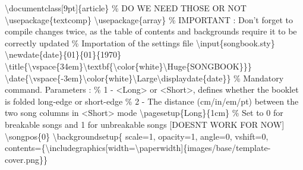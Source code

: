 \documentclass{article}%
\begin{document}
%
\normalsize%
\textbackslash{}documentclass{[}9pt{]}\{article\}\newline%
\newline%
\% DO WE NEED THOSE OR NOT\newline%
\textbackslash{}usepackage\{textcomp\}\newline%
\textbackslash{}usepackage\{array\}\newline%
\newline%
\% IMPORTANT : Don't forget to compile changes twice, as the table of contents and backgrounds require it to be correctly updated\newline%
\newline%
\% Importation of the settings file\newline%
\textbackslash{}input\{songbook.sty\}\newline%
 \newline%
\textbackslash{}newdate\{date\}\{01\}\{01\}\{1970\}\newline%
\textbackslash{}title\{\textbackslash{}vspace\{34em\}\textbackslash{}textbf\{\textbackslash{}color\{white\}\textbackslash{}Huge\{SONGBOOK\}\}\}\newline%
\textbackslash{}date\{\textbackslash{}vspace\{{-}3em\}\textbackslash{}color\{white\}\textbackslash{}Large\textbackslash{}displaydate\{date\}\}\newline%
\newline%
\% Mandatory command. Parameters :\newline%
\% 1 {-} <Long> or <Short>, defines whether the booklet is folded long{-}edge or short{-}edge\newline%
\% 2 {-} The distance (cm/in/em/pt) between the two song columns in <Short> mode\newline%
\textbackslash{}pagesetup\{Long\}\{1cm\}\newline%
\newline%
\% Set to 0 for breakable songs and 1 for unbreakable songs {[}DOESNT WORK FOR NOW{]}\newline%
\textbackslash{}songpos\{0\}\newline%
\newline%
\textbackslash{}backgroundsetup\{\newline%
	scale=1,\newline%
	opacity=1,\newline%
	angle=0,\newline%
	vshift=0,\newline%
	contents=\{\textbackslash{}includegraphics{[}width=\textbackslash{}paperwidth{]}\{images/base/template{-}cover.png\}\}\newline%
\end{document}
